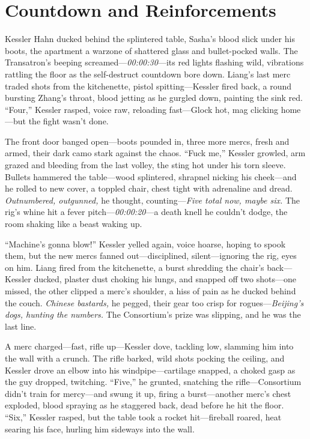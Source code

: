 \documentclass[12pt]{book}
\begin{document}
\section{Countdown and Reinforcements}

Kessler Hahn ducked behind the splintered table, Sasha’s blood slick under his boots, the apartment a warzone of shattered glass and bullet-pocked walls. The Transatron’s beeping screamed—\textit{00:00:30}—its red lights flashing wild, vibrations rattling the floor as the self-destruct countdown bore down. Liang’s last merc traded shots from the kitchenette, pistol spitting—Kessler fired back, a round bursting Zhang’s throat, blood jetting as he gurgled down, painting the sink red. “Four,” Kessler rasped, voice raw, reloading fast—Glock hot, mag clicking home—but the fight wasn’t done.

The front door banged open—boots pounded in, three more mercs, fresh and armed, their dark camo stark against the chaos. “Fuck me,” Kessler growled, arm grazed and bleeding from the last volley, the sting hot under his torn sleeve. Bullets hammered the table—wood splintered, shrapnel nicking his cheek—and he rolled to new cover, a toppled chair, chest tight with adrenaline and dread. \textit{Outnumbered, outgunned,} he thought, counting—\textit{Five total now, maybe six.} The rig’s whine hit a fever pitch—\textit{00:00:20}—a death knell he couldn’t dodge, the room shaking like a beast waking up.

“Machine’s gonna blow!” Kessler yelled again, voice hoarse, hoping to spook them, but the new mercs fanned out—disciplined, silent—ignoring the rig, eyes on him. Liang fired from the kitchenette, a burst shredding the chair’s back—Kessler ducked, plaster dust choking his lungs, and snapped off two shots—one missed, the other clipped a merc’s shoulder, a hiss of pain as he ducked behind the couch. \textit{Chinese bastards,} he pegged, their gear too crisp for rogues—\textit{Beijing’s dogs, hunting the numbers.} The Consortium’s prize was slipping, and he was the last line.

A merc charged—fast, rifle up—Kessler dove, tackling low, slamming him into the wall with a crunch. The rifle barked, wild shots pocking the ceiling, and Kessler drove an elbow into his windpipe—cartilage snapped, a choked gasp as the guy dropped, twitching. “Five,” he grunted, snatching the rifle—Consortium didn’t train for mercy—and swung it up, firing a burst—another merc’s chest exploded, blood spraying as he staggered back, dead before he hit the floor. “Six,” Kessler rasped, but the table took a rocket hit—fireball roared, heat searing his face, hurling him sideways into the wall.
\end{document}

